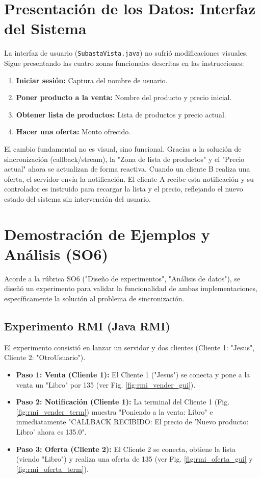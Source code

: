 \documentclass[11pt, a4paper]{article}
\begin{document}
\section{Presentación de los Datos: Interfaz del Sistema}
\label{sec:interfaz}

La interfaz de usuario (\texttt{SubastaVista.java}) no sufrió modificaciones visuales. Sigue presentando las cuatro zonas funcionales descritas en las instrucciones:
\begin{enumerate}
    \item \textbf{Iniciar sesión:} Captura del nombre de usuario.
    \item \textbf{Poner producto a la venta:} Nombre del producto y precio inicial.
    \item \textbf{Obtener lista de productos:} Lista de productos y precio actual.
    \item \textbf{Hacer una oferta:} Monto ofrecido.
\end{enumerate}

El cambio fundamental no es visual, sino funcional. Gracias a la solución de sincronización (callback/stream), la "Zona de lista de productos" y el "Precio actual" ahora se actualizan de forma reactiva. Cuando un cliente B realiza una oferta, el servidor envía la notificación. El cliente A recibe esta notificación y su controlador es instruido para recargar la lista y el precio, reflejando el nuevo estado del sistema sin intervención del usuario.

\section{Demostración de Ejemplos y Análisis (SO6)}
\label{sec:demo}

Acorde a la rúbrica SO6 ("Diseño de experimentos", "Análisis de datos"), se diseñó un experimento para validar la funcionalidad de ambas implementaciones, específicamente la solución al problema de sincronización.

\subsection{Experimento RMI (Java RMI)}
El experimento consistió en lanzar un servidor y dos clientes (Cliente 1: "Jesus", Cliente 2: "OtroUsuario").
\begin{itemize}
    \item \textbf{Paso 1: Venta (Cliente 1):} El Cliente 1 ("Jesus") se conecta y pone a la venta un "Libro" por 135 (ver Fig. \ref{fig:rmi_vender_gui}).
    \item \textbf{Paso 2: Notificación (Cliente 1):} La terminal del Cliente 1 (Fig. \ref{fig:rmi_vender_term}) muestra "Poniendo a la venta: Libro" e inmediatamente "CALLBACK RECIBIDO: El precio de 'Nuevo producto: Libro' ahora es 135.0".
    \item \textbf{Paso 3: Oferta (Cliente 2):} El Cliente 2 se conecta, obtiene la lista (viendo "Libro") y realiza una oferta de 135 (ver Fig. \ref{fig:rmi_oferta_gui} y \ref{fig:rmi_oferta_term}).
\end{itemize}
\end{document}
